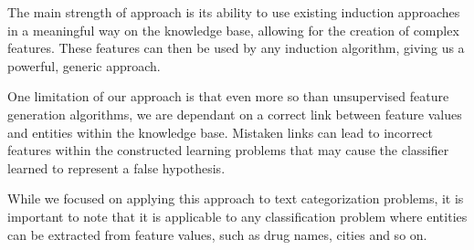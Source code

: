 \documentclass[twoside,11pt]{article}
\theoremstyle{definition}
\begin{document}
The main strength of approach is its ability to use existing induction approaches in a meaningful way on the knowledge base, allowing for the creation of complex features. These features can then be used by any induction algorithm, giving us a powerful, generic approach.

One limitation of our approach is that even more so than unsupervised feature generation algorithms,  we are dependant on a correct link between feature values and entities within the knowledge base. Mistaken links can lead to incorrect features within the constructed learning problems that may cause the classifier learned to represent a false hypothesis. 

While we focused on applying this approach to text categorization problems, it is important to note that it is applicable to any classification problem where entities can be extracted from feature values, such as drug names, cities and so on. 

\clearpage
\vskip 0.2in


\end{document}
